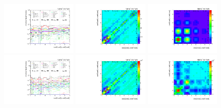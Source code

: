 \begin{refsection}
\begin{figure}[htb]
\begin{center}
 \includegraphics[width=0.32\textwidth]{fig_fullRun2UL/unfolding/combined/deltaSystCombinedlog_rebinnedB_c_Pnk_mttbar.pdf}
 \includegraphics[width=0.32\textwidth]{fig_fullRun2UL/unfolding/combined/StatCovMatrix_rebinnedB_c_Pnk_mttbar.pdf}
 \includegraphics[width=0.32\textwidth]{fig_fullRun2UL/unfolding/combined/TotalSystCovMatrix_rebinnedB_c_Pnk_mttbar.pdf} \\
 \includegraphics[width=0.32\textwidth]{fig_fullRun2UL/unfolding/combined/deltaSystCombinedlogNorm_rebinnedB_c_Pnk_mttbar.pdf}
 \includegraphics[width=0.32\textwidth]{fig_fullRun2UL/unfolding/combined/StatCovMatrixNorm_rebinnedB_c_Pnk_mttbar.pdf}
 \includegraphics[width=0.32\textwidth]{fig_fullRun2UL/unfolding/combined/TotalSystCovMatrixNorm_rebinnedB_c_Pnk_mttbar.pdf} \\

\end{center}
\end{figure}
\end{refsection}
